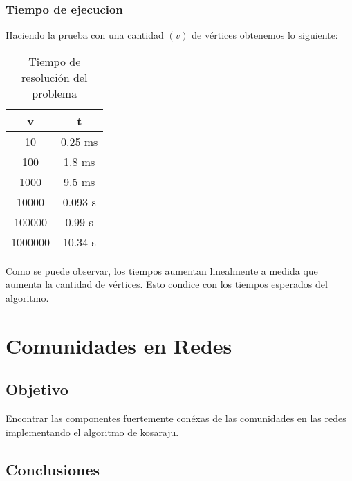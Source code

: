 \documentclass{article}
\begin{document}
            \subsubsection{Tiempo de ejecucion}
                Haciendo la prueba con una cantidad $(v)$ de vértices obtenemos lo siguiente:
                \begin{table}[h!]
                    \centering
                    \caption{Tiempo de resolución del problema}
                    \begin{tabular}{c|c}
                        v & t \\
                        \hline
                        10 & 0.25 ms \\
                        \hline
                        100 & 1.8 ms \\
                        \hline
                        1000 & 9.5 ms \\
                        \hline
                        10000 & 0.093 s \\
                        \hline
                        100000 & 0.99 s \\
                        \hline
                        1000000 & 10.34 s
                    \end{tabular}
                \end{table}

                Como se puede observar, los tiempos aumentan linealmente a medida
                que aumenta la cantidad de vértices. Esto condice con los tiempos
                esperados del algoritmo.


    \section{Comunidades en Redes}
        \subsection{Objetivo}
          Encontrar las componentes fuertemente conéxas de las comunidades en las
          redes implementando el algoritmo de kosaraju.
        \subsection{Conclusiones}
\end{document}
